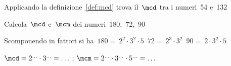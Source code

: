 \subsubsection*{}

\begin{esercizio}
Applicando la definizione~\ref{def:mcd} trova il~\(\mcd\) tra i numeri~54 
e~132
\end{esercizio}


\begin{esercizio}
Calcola~\(\mcd\) e~\(\mcm\) dei numeri~180,~72,~90

Scomponendo in fattori si 
ha~\(180=~2^2\cdot3^2\cdot5\)~\(72 =~2^3\cdot3^2\)~\(90 =~2\cdot3^2\cdot5\)

\(\mcd =2^{\ldots}\cdot3^{\ldots}=\ldots\) \quad \quad \quad ; \quad
{}
\(\mcm =2^{\ldots}\cdot3^{\ldots}\cdot5^{\ldots}=\ldots\) \quad \quad \quad
{}

\end{esercizio}



